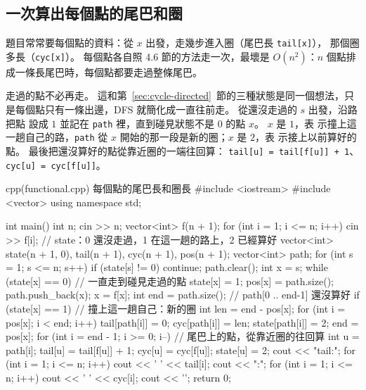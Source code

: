\subsection{一次算出每個點的尾巴和圈}

題目常常要每個點的資料：從 $x$ 出發，走幾步進入圈（尾巴長 \texttt{tail[x]}），
那個圈多長（\texttt{cyc[x]}）。 每個點各自照 4.6 節的方法走一次，最壞是
$O(n^2)$：$n$ 個點排成一條長尾巴時，每個點都要走過整條尾巴。

走過的點不必再走。 這和第~\ref{sec:cycle-directed}~節的三種狀態是同一個想法，只
是每個點只有一條出邊，DFS 就簡化成一直往前走。 從還沒走過的 $s$ 出發，沿路把點
設成 $1$ 並記在 \texttt{path} 裡，直到碰見狀態不是 $0$ 的點 $x$。 $x$ 是 $1$，表
示撞上這一趟自己的路，\texttt{path} 從 $x$ 開始的那一段是新的圈；$x$ 是 $2$，表
示接上以前算好的點。 最後把還沒算好的點從靠近圈的一端往回算：
\texttt{tail[u] = tail[f[u]] + 1}、\texttt{cyc[u] = cyc[f[u]]}。

\begin{example}[label=ex:functional]{cpp}{(functional.cpp) 每個點的尾巴長和圈長}
#include <iostream>
#include <vector>
using namespace std;

int main() {
    int n;
    cin >> n;
    vector<int> f(n + 1);
    for (int i = 1; i <= n; i++) {
        cin >> f[i];
    }
    // state：0 還沒走過，1 在這一趟的路上，2 已經算好
    vector<int> state(n + 1, 0), tail(n + 1), cyc(n + 1), pos(n + 1);
    vector<int> path;
    for (int s = 1; s <= n; s++) {
        if (state[s] != 0) {
            continue;
        }
        path.clear();
        int x = s;
        while (state[x] == 0) {            // 一直走到碰見走過的點
            state[x] = 1;
            pos[x] = path.size();
            path.push_back(x);
            x = f[x];
        }
        int end = path.size();             // path[0 .. end-1] 還沒算好
        if (state[x] == 1) {               // 撞上這一趟自己：新的圈
            int len = end - pos[x];
            for (int i = pos[x]; i < end; i++) {
                tail[path[i]] = 0;
                cyc[path[i]] = len;
                state[path[i]] = 2;
            }
            end = pos[x];
        }
        for (int i = end - 1; i >= 0; i--) {   // 尾巴上的點，從靠近圈的往回算
            int u = path[i];
            tail[u] = tail[f[u]] + 1;
            cyc[u] = cyc[f[u]];
            state[u] = 2;
        }
    }
    cout << "tail:";
    for (int i = 1; i <= n; i++) {
        cout << ' ' << tail[i];
    }
    cout << "\ncycle:";
    for (int i = 1; i <= n; i++) {
        cout << ' ' << cyc[i];
    }
    cout << '\n';
    return 0;
}
\end{example}

